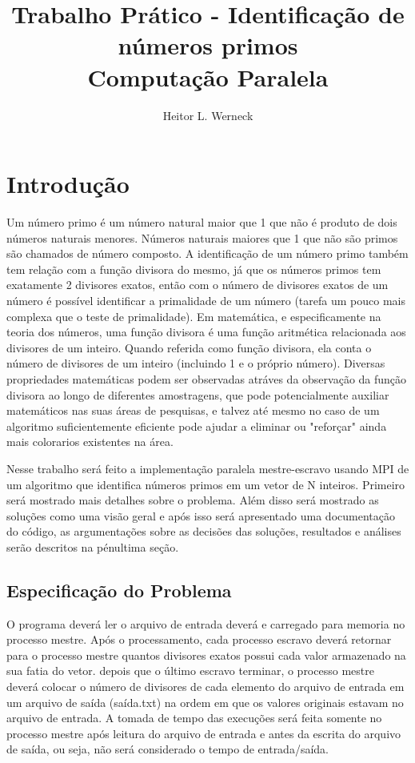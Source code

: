 \documentclass{article}
\title{Trabalho Prático - Identificação de números primos \\
	\large Computação Paralela}
\author{Heitor L. Werneck}
\begin{document}
\maketitle

\section{Introdução}

Um número primo é um número natural maior que 1 que não é produto de dois
números naturais menores. Números naturais maiores que 1 que não são primos são
chamados de número composto. A identificação de um número primo também tem
relação com a função divisora do mesmo, já que os números primos tem exatamente
2 divisores exatos, então com o número de divisores exatos de um número é
possível identificar a primalidade de um número (tarefa um pouco mais complexa
que o teste de primalidade). Em matemática, e especificamente na teoria dos
números, uma função divisora é uma função aritmética relacionada aos divisores
de um inteiro. Quando referida como função divisora, ela conta o número de
divisores de um inteiro (incluindo 1 e o próprio número). Diversas propriedades
matemáticas podem ser observadas atráves da observação da função divisora ao
longo de diferentes amostragens, que pode potencialmente auxiliar matemáticos
nas suas áreas de pesquisas, e talvez até mesmo no caso de um algoritmo
suficientemente eficiente pode ajudar a eliminar ou "reforçar" ainda mais
colorarios existentes na área.

Nesse trabalho será feito a implementação paralela mestre-escravo usando MPI de um algoritmo que identifica números primos em um vetor de N inteiros. Primeiro será mostrado mais detalhes sobre o problema. Além disso será mostrado as soluções como uma visão geral e após isso será apresentado uma documentação do código, as argumentações sobre as decisões das soluções, resultados e análises serão descritos na pénultima seção.

\subsection{Especificação do Problema}
O programa deverá ler o arquivo de entrada deverá e carregado para memoria no
processo mestre. Após o processamento, cada processo escravo deverá retornar
para
o processo mestre quantos divisores exatos possui cada valor armazenado na
sua fatia do vetor. depois que o último escravo terminar, o processo mestre
deverá colocar o número de divisores de cada elemento do arquivo de entrada
em um arquivo de saída (saída.txt) na ordem em que os valores originais
estavam no arquivo de entrada. A tomada de tempo das execuções será
feita somente no processo mestre após leitura do arquivo de entrada e antes
da escrita do arquivo de saída, ou seja,
não será considerado o tempo de
entrada/saída.
\end{document}
